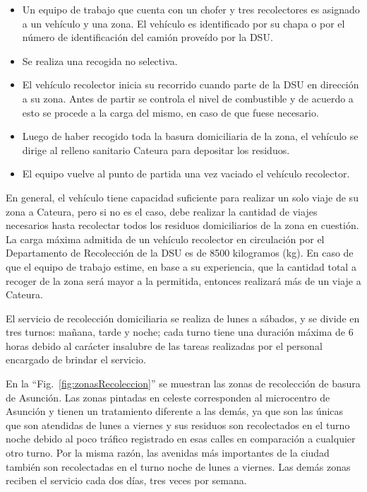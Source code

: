 \documentclass[conference]{IEEEtran}
\begin{document}
\begin{itemize}
\item Un equipo de trabajo que cuenta con un chofer y tres recolectores es asignado a un vehículo y una zona. El vehículo es identificado por su chapa o por el número de identificación del camión proveído por la DSU.
\item Se realiza una recogida no selectiva.
\item El vehículo recolector inicia su recorrido cuando parte de la DSU en dirección a su zona. Antes de partir se controla el nivel de combustible y de acuerdo a esto se procede a la carga del mismo, en caso de que fuese necesario.
\item Luego de haber recogido toda la basura domiciliaria de la zona, el vehículo se dirige al relleno sanitario Cateura para depositar los residuos.
\item El equipo vuelve al punto de partida una vez vaciado el vehículo recolector.  
\end{itemize}

En general, el vehículo tiene capacidad suficiente para realizar un solo viaje de su zona a Cateura, pero si no es el caso, debe realizar la cantidad de viajes necesarios hasta recolectar todos los residuos domiciliarios de la zona en cuestión. La carga máxima admitida de un vehículo recolector en circulación por el Departamento de Recolección de la DSU es de 8500 kilogramos (kg). En caso de que el equipo de trabajo estime, en base a su experiencia, que la cantidad total a recoger de la zona será mayor a la permitida, entonces realizará más de un viaje a Cateura.

El servicio de recolección domiciliaria se realiza de lunes a sábados, y se divide en tres turnos: mañana, tarde y noche; cada turno tiene una duración máxima de 6 horas debido al carácter insalubre de las tareas realizadas por el personal encargado de brindar el servicio.

En la ``Fig.~\ref{fig:zonasRecoleccion}'' se muestran las zonas de recolección de basura de Asunción. Las zonas pintadas en celeste corresponden al microcentro de Asunción y tienen un tratamiento diferente a las demás, ya que son las únicas que son atendidas de lunes a viernes y sus residuos son recolectados en el turno noche debido al poco tráfico registrado en esas calles en comparación a cualquier otro turno. Por la misma razón, las avenidas más importantes de la ciudad también son recolectadas en el turno noche de lunes a viernes. Las demás zonas reciben el servicio cada dos días, tres veces por semana.
\end{document}
